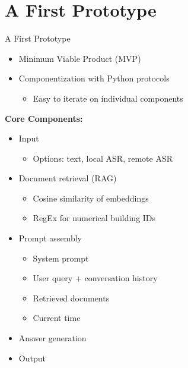 \documentclass{sdqbeamer}[smallfoot]
\begin{document}
\section{A First Prototype}
\begin{frame}[picture vertical=57,picture=images/old_ui_screenshot,kitlogo=white]{A First Prototype}
    \vspace{-1.0cm}
    \begin{itemize}
        \item Minimum Viable Product (MVP)
        \item Componentization with Python protocols
            \begin{itemize}
                \item Easy to iterate on individual components
            \end{itemize}
    \end{itemize}
    \vspace{0.5cm}
    \textbf{Core Components:}
    \begin{itemize}
        \item Input
            \begin{itemize}
                \item Options: text, local ASR, remote ASR
            \end{itemize}
        \item Document retrieval (RAG)
            \begin{itemize}
                \item Cosine similarity of embeddings
                \item RegEx for numerical building IDs
            \end{itemize}
        \item Prompt assembly
            \begin{itemize}
                \item System prompt
                \item User query + conversation history
                \item Retrieved documents
                \item Current time
            \end{itemize}
        \item Answer generation
        \item Output
    \end{itemize}
\end{frame}
\end{document}
